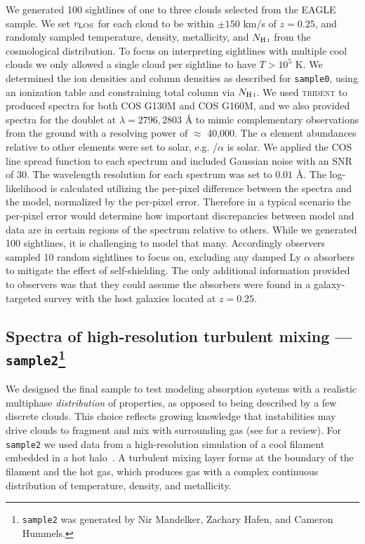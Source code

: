 \documentclass[fleqn,usenatbib]{mnras}
\begin{document}
We generated 100 sightlines of one to three clouds selected from the EAGLE sample.
We set $v_{\rm LOS}$ for each cloud to be within $\pm150$ km/s of $z=0.25$, and randomly sampled temperature, density, metallicity, and $N_{\ion{H}{I}}$ from the cosmological distribution.
To focus on interpreting sightlines with multiple cool clouds we only allowed a single cloud per sightline to have $T>10^5$ K.
We determined the ion densities and column densities as described for \texttt{sample0}, using an ionization table and constraining total column via $N_{\ion{H}{I}}$.
We used \textsc{trident} to produced spectra for both COS G130M and COS G160M, and we also provided spectra for the  doublet at $\lambda = 2796, 2803$ {\AA} to mimic complementary observations from the ground with a resolving power of $\approx$ 40,000.
The $\alpha$ element abundances relative to other elements were set to solar, e.g. /$\alpha$ is solar.
We applied the COS line spread function to each spectrum and included Gaussian noise with an SNR of 30.
The wavelength resolution for each spectrum was set to $0.01$ \AA.
The log-likelihood is calculated utilizing the per-pixel difference between the spectra and the model, normalized by the per-pixel error.
Therefore in a typical scenario the per-pixel error would determine how important discrepancies between model and data are in certain regions of the spectrum relative to others.
While we generated 100 sightlines, it is challenging to model that many.
Accordingly observers sampled 10 random sightlines to focus on, excluding any damped Ly $\alpha$ absorbers to mitigate the effect of self-shielding.
The only additional information provided to observers was that they could assume the absorbers were found in a galaxy-targeted survey with the host galaxies located at $z=0.25$.

\subsection[Spectra of high-resolution turbulent mixing --- \texttt{sample2}]{Spectra of high-resolution turbulent mixing --- \texttt{sample2}\footnote{
\texttt{sample2} was generated by Nir Mandelker, Zachary Hafen, and Cameron Hummels.}}
\label{s: data generation -- sample2}

We designed the final sample to test modeling absorption systems with a realistic multiphase \textit{distribution} of properties, as opposed to being described by a few discrete clouds.
This choice reflects growing knowledge that instabilities may drive clouds to fragment and mix with surrounding gas (see \citealt{faucher-giguere2023Key} for a review).
For \texttt{sample2} we used data from a high-resolution simulation of a cool filament embedded in a hot halo~\citep{mandelker2020Instability}.
A turbulent mixing layer forms at the boundary of the filament and the hot gas, which produces gas with a complex continuous distribution of temperature, density, and metallicity.
\end{document}
